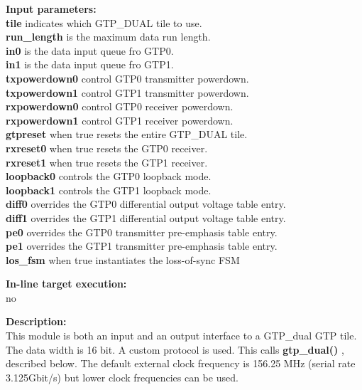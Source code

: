             {\bf Input parameters:} \\
            {\bf tile} indicates which GTP\_DUAL tile to use.\\
            {\bf run\_length} is the maximum data run length.\\
            {\bf in0} is the data input queue fro GTP0.\\
            {\bf in1} is the data input queue fro GTP1.\\
            {\bf txpowerdown0} control GTP0 transmitter powerdown.\\
            {\bf txpowerdown1} control GTP1 transmitter powerdown.\\
            {\bf rxpowerdown0} control GTP0 receiver powerdown.\\
            {\bf rxpowerdown1} control GTP1 receiver powerdown.\\
            {\bf gtpreset} when true resets the entire GTP\_DUAL tile.\\
            {\bf rxreset0} when true resets the GTP0 receiver.\\
            {\bf rxreset1} when true resets the GTP1 receiver.\\
            {\bf loopback0} controls the GTP0 loopback mode.\\
            {\bf loopback1} controls the GTP1 loopback mode.\\
            {\bf diff0} overrides the GTP0 differential output voltage table entry.\\
            {\bf diff1} overrides the GTP1 differential output voltage table entry.\\
            {\bf pe0} overrides the GTP0 transmitter pre-emphasis table entry.\\
            {\bf pe1} overrides the GTP1 transmitter pre-emphasis table entry.\\
            {\bf los\_fsm} when true instantiates the loss-of-sync FSM

            {\bf In-line target execution:} \\
            no

            {\bf Description:} \\
            This module is both an input and an output interface to a
            GTP\_dual GTP tile. The data width is 16 bit. A custom
            protocol is used. This calls {\bf
            gtp\_dual()} , described below.
            The default external clock frequency is 156.25 MHz (serial
            rate 3.125Gbit/s) but lower clock frequencies can be used.
            
